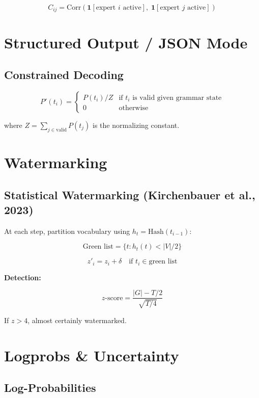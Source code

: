 \documentclass[11pt,a4paper]{article}
\begin{document}
$$C_{ij} = \text{Corr}\!\left(\mathbf{1}[\text{expert } i \text{ active}],\; \mathbf{1}[\text{expert } j \text{ active}]\right)$$

\section{Structured Output / JSON Mode}

\subsection{Constrained Decoding}

$$P'(t_i) = \begin{cases} P(t_i) / Z & \text{if } t_i \text{ is valid given grammar state} \\ 0 & \text{otherwise} \end{cases}$$

where $Z = \sum_{j \in \text{valid}} P(t_j)$ is the normalizing constant.

\section{Watermarking}

\subsection{Statistical Watermarking (Kirchenbauer et al., 2023)}

At each step, partition vocabulary using $h_t = \text{Hash}(t_{i-1})$:

$$\text{Green list} = \{t : h_t(t) < |V|/2\}$$

$$z'_i = z_i + \delta \quad \text{if } t_i \in \text{green list}$$

\textbf{Detection:}

$$z\text{-score} = \frac{|G| - T/2}{\sqrt{T/4}}$$

If $z > 4$, almost certainly watermarked.

\section{Logprobs \& Uncertainty}

\subsection{Log-Probabilities}
\end{document}
